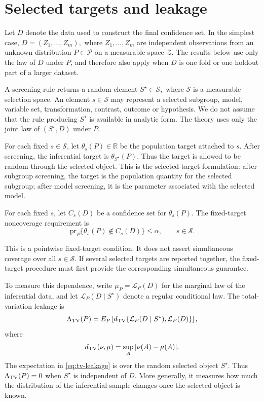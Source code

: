 \documentclass[11pt]{article}
\newcommand{\Rr}{\mathbb R}
\newcommand{\calZ}{\mathcal Z}
\newcommand{\calS}{\mathcal S}
\newcommand{\calP}{\mathcal P}
\begin{document}
\section{Selected targets and leakage}
\label{sec:setup}

Let \(D\) denote the data used to construct the final confidence set. In the simplest case, $D=(Z_1,\ldots,Z_m),$ where \(Z_1,\ldots,Z_m\) are independent observations from an unknown distribution \(P\in\calP\) on a measurable space \(\calZ\). The results below use only the law of \(D\) under \(P\), and therefore also apply when \(D\) is one fold or one
holdout part of a larger dataset.

A screening rule returns a random element $S^\star\in\calS,$ where \(\calS\) is a measurable selection space. An element \(s\in\calS\) may
represent a selected subgroup, model, variable set, transformation, contrast, outcome or hypothesis. We do not assume that the rule producing \(S^\star\) is available in analytic form. The theory uses only the joint law of \((S^\star,D)\) under \(P\).

For each fixed \(s\in\calS\), let $\theta_s(P)\in\Rr$ be the population target attached to \(s\). After screening, the inferential target is $
\theta_{S^\star}(P).$ Thus the target is allowed to be random through the selected object. This is the selected-target formulation: after subgroup screening, the target is the population quantity for the selected subgroup; after model screening, it is the parameter associated with the selected model.

For each fixed \(s\), let \(C_s(D)\) be a confidence set for \(\theta_s(P)\). The fixed-target noncoverage requirement is
\begin{equation}
	\label{eq:fixed-noncoverage}
	\mathrm{pr}_P\{\theta_s(P)\notin C_s(D)\}\leq \alpha,
	\qquad s\in\calS .
\end{equation}

This is a pointwise fixed-target condition. It does not assert simultaneous coverage over all \(s\in\mathcal S\). If several selected targets are reported together, the fixed-target procedure must first provide the corresponding simultaneous guarantee.

To measure this dependence, write $\mu_P=\mathcal L_P(D)$ for the marginal law of the inferential data, and let $\mathcal L_P(D\mid S^\star)$ denote a regular conditional law. The total-variation leakage is
\begin{equation}
	\label{eq:tv-leakage}
	\Lambda_{\rm TV}(P)
	=
	E_P\left[
	d_{\rm TV}\{\mathcal L_P(D\mid S^\star),\mathcal L_P(D)\}
	\right],
\end{equation}
where
\[
d_{\rm TV}(\nu,\mu)=\sup_A|\nu(A)-\mu(A)|.
\]
The expectation in \eqref{eq:tv-leakage} is over the random selected object \(S^\star\). Thus \(\Lambda_{\rm TV}(P)=0\) when \(S^\star\) is independent of \(D\). More generally, it measures how much the distribution of the inferential sample changes once the selected object is known.
\end{document}
